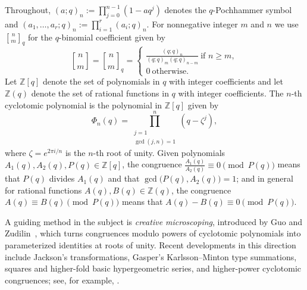 \documentclass[reqno]{amsart}
\theoremstyle{definition}
\theoremstyle{plain}
\theoremstyle{remark}
\newcommand{\fr}{\frac}
\numberwithin{equation}{section}
\begin{document}
Throughout, $(a;q)_n:=\prod_{j=0}^{n-1}(1-aq^j)$ denotes the $q$-Pochhammer symbol and $(a_1,\ldots,a_r;q)_n:=\prod_{i=1}^r(a_i;q)_n$.
For nonnegative integer $m$ and $n$ we use ${n\brack m}_q$ for the $q$-binomial coefficient given by
\[
{n\brack m} = {n \brack m}_q
=\begin{cases}
\frac{(q;q)_n}{(q;q)_m (q;q)_{n-m}}\ \text{if\ } n\geq m, \\
0\ \text{otherwise.}
\end{cases}
\]
Let
$\mathbb{Z}[q]$ denote the set of polynomials in $q$ with integer coefficients and let
$\mathbb{Z}(q)$ denote the set of rational functions in $q$ with integer coefficients.
The $n$-th cyclotomic polynomial is the polynomial in $\mathbb{Z}[q]$ given by
\[
\Phi_n(q) = \prod_{\substack{j=1 \\ \gcd(j,n)=1}}^n(q- \zeta^j) ,
\]
where $\zeta = e^{2\pi i/n}$ is the $n$-th root of unity.
Given polynomials $A_1(q), A_2(q), P(q) \in \mathbb{Z}[q]$, the congruence
$\fr{A_1(q)}{A_2(q)} \equiv 0 \pmod{P(q)}$ means that $P(q)$ divides $A_1(q)$ and that
$\gcd\big(P(q),A_2(q) \big) =1$; and in general for rational functions $A(q), B(q) \in\mathbb{Z}(q)$,
the congruence $A(q)\equiv B(q) \pmod{P(q)}$ means that $A(q)-B(q)\equiv 0\pmod{P(q)}$.


A guiding method in the subject is \emph{creative microscoping}, introduced by Guo and Zudilin~\cite{guo-zudilin}, which turns congruences modulo powers of cyclotomic polynomials into parameterized identities at roots of unity.
Recent developments in this direction include Jackson's transformations, Gasper’s Karlsson--Minton type summations,
squares and higher-fold basic hypergeometric series, and higher-power cyclotomic congruences; see, for example, \cite{guo-li-squares,guo-schlosser-threefam,maithy-barman,wei-jcta}.
\end{document}
